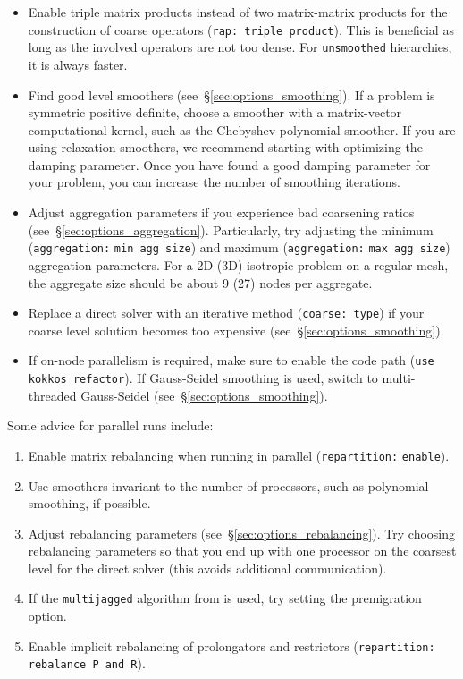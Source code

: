 \begin{itemize}
  \item
    Enable triple matrix products instead of two matrix-matrix products for
    the construction of coarse operators (\texttt{rap: triple product}).
    This is beneficial as long as the involved operators are not too dense.
    For \texttt{unsmoothed} hierarchies, it is always faster.

  \item
    Find good level smoothers (see~\S\ref{sec:options_smoothing}). If a problem
    is symmetric positive definite, choose a smoother with a matrix-vector
    computational kernel, such as the Chebyshev polynomial smoother. If you are
    using relaxation smoothers, we recommend starting with optimizing the
    damping parameter. Once you have found a good damping parameter for your
    problem, you can increase the number of smoothing iterations.

  \item
    Adjust aggregation parameters if you experience bad coarsening ratios
    (see~\S\ref{sec:options_aggregation}). Particularly, try adjusting the
    minimum (\texttt{aggregation:} \texttt{min agg size}) and maximum
    (\texttt{aggregation:} \texttt{max agg size}) aggregation parameters. For a
    2D (3D) isotropic problem on a regular mesh, the aggregate size should be
    about 9 (27) nodes per aggregate.

  \item
    Replace a direct solver with an iterative method (\texttt{coarse: type}) if
    your coarse level solution becomes too expensive (see~\S\ref{sec:options_smoothing}).

  \item
    If on-node parallelism is required, make sure to enable the \kokkos code path (\texttt{use kokkos refactor}).
    If Gauss-Seidel smoothing is used, switch to multi-threaded Gauss-Seidel (see~\S\ref{sec:options_smoothing}).

\end{itemize}

Some advice for parallel runs include:
\begin{enumerate}
  \item
    Enable matrix rebalancing when running in parallel (\texttt{repartition:}
    \texttt{enable}).

  \item
    Use smoothers invariant to the number of processors, such as
    polynomial smoothing, if possible.

  \item
    Adjust rebalancing parameters (see~\S\ref{sec:options_rebalancing}). Try
    choosing rebalancing parameters so that you end up with one processor on the
    coarsest level for the direct solver (this avoids additional communication).

  \item
    If the \texttt{multijagged} algorithm from  is used, try setting the premigration option.

  \item
    Enable implicit rebalancing of prolongators and restrictors
    (\texttt{repartition: rebalance P and R}).
\end{enumerate}

